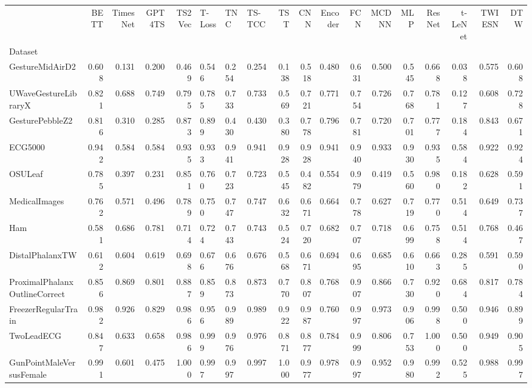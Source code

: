 \begin{tabular}{lrrrrlllrrrrrrrrrr}
\toprule
 & BETT & TimesNet & GPT4TS & TS2Vec & T-Loss & TNC & TS-TCC & TST & CNN & Encoder & FCN & MCDNN & MLP & ResNet & t-LeNet & TWIESN & DTW \\
Dataset &  &  &  &  &  &  &  &  &  &  &  &  &  &  &  &  &  \\
\midrule
GestureMidAirD2 & 0.608 & 0.131 & 0.200 & 0.469 & 0.546 & 0.254 & 0.254 & 0.138 & 0.518 & 0.480 & 0.631 & 0.500 & 0.545 & 0.668 & 0.038 & 0.575 & 0.608 \\
UWaveGestureLibraryX & 0.821 & 0.688 & 0.749 & 0.795 & 0.785 & 0.733 & 0.733 & 0.569 & 0.721 & 0.771 & 0.754 & 0.726 & 0.768 & 0.781 & 0.127 & 0.608 & 0.728 \\
GesturePebbleZ2 & 0.816 & 0.310 & 0.285 & 0.873 & 0.899 & 0.430 & 0.430 & 0.380 & 0.778 & 0.796 & 0.781 & 0.720 & 0.701 & 0.777 & 0.184 & 0.843 & 0.671 \\
ECG5000 & 0.942 & 0.584 & 0.584 & 0.935 & 0.933 & 0.941 & 0.941 & 0.928 & 0.928 & 0.941 & 0.940 & 0.933 & 0.930 & 0.935 & 0.584 & 0.922 & 0.924 \\
OSULeaf & 0.785 & 0.397 & 0.231 & 0.851 & 0.760 & 0.723 & 0.723 & 0.545 & 0.482 & 0.554 & 0.979 & 0.419 & 0.560 & 0.980 & 0.182 & 0.628 & 0.591 \\
MedicalImages & 0.762 & 0.571 & 0.496 & 0.789 & 0.750 & 0.747 & 0.747 & 0.632 & 0.671 & 0.664 & 0.778 & 0.627 & 0.719 & 0.770 & 0.514 & 0.649 & 0.737 \\
Ham & 0.581 & 0.686 & 0.781 & 0.714 & 0.724 & 0.743 & 0.743 & 0.524 & 0.720 & 0.682 & 0.707 & 0.718 & 0.699 & 0.758 & 0.514 & 0.768 & 0.467 \\
DistalPhalanxTW & 0.612 & 0.604 & 0.619 & 0.698 & 0.676 & 0.676 & 0.676 & 0.568 & 0.671 & 0.694 & 0.695 & 0.685 & 0.610 & 0.663 & 0.285 & 0.591 & 0.590 \\
ProximalPhalanxOutlineCorrect & 0.856 & 0.869 & 0.801 & 0.887 & 0.859 & 0.873 & 0.873 & 0.770 & 0.807 & 0.768 & 0.907 & 0.866 & 0.730 & 0.920 & 0.684 & 0.817 & 0.784 \\
FreezerRegularTrain & 0.982 & 0.926 & 0.829 & 0.986 & 0.956 & 0.989 & 0.989 & 0.922 & 0.987 & 0.760 & 0.997 & 0.973 & 0.906 & 0.998 & 0.500 & 0.946 & 0.899 \\
TwoLeadECG & 0.847 & 0.633 & 0.658 & 0.986 & 0.999 & 0.976 & 0.976 & 0.871 & 0.877 & 0.784 & 0.999 & 0.806 & 0.753 & 1.000 & 0.500 & 0.949 & 0.905 \\
GunPointMaleVersusFemale & 0.991 & 0.601 & 0.475 & 1.000 & 0.997 & 0.997 & 0.997 & 1.000 & 0.977 & 0.978 & 0.997 & 0.952 & 0.980 & 0.992 & 0.525 & 0.988 & 0.997 \\

\end{tabular}

